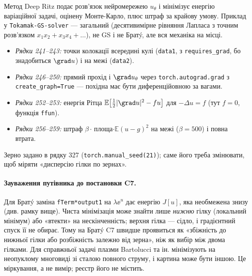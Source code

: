 Метод Deep Ritz \cite{EYu2018} подає розв'язок нейромережею $u_\theta$ і мінімізує
енергію варіаційної задачі, оцінену Монте-Карло, плюс штраф за крайову умову. Приклад у
\texttt{Tokamak-GS-solver} --- загальний (десятивимірне рівняння Лапласа з точним
розв'язком $x_1x_2+x_3x_4+\ldots$), не GS і не Братý, але вся механіка на місці.


\begin{itemize}
\item \emph{Рядки 241--243:} точки колокації всередині кулі (\texttt{data1}, з
  \texttt{requires\_grad}, бо знадобиться $\grad u$) і на межі (\texttt{data2}).
\item \emph{Рядки 246--250:} прямий прохід і $\grad u_\theta$ через
  \texttt{torch.autograd.grad} з \texttt{create\_graph=True} --- похідна має бути
  диференційовною за вагами.
\item \emph{Рядки 252--253:} енергія Рітца $\mathbb{E}\bigl[\tfrac12|\grad u|^2-fu\bigr]$ для
  $-\Delta u=f$ (тут $f=0$, функція \texttt{ffun}).
\item \emph{Рядки 256--259:} штраф $\beta\cdot$\,площа$\cdot\mathbb{E}(u-g)^2$ на межі
  ($\beta=500$) і повна втрата.
\end{itemize}
Зерно задано в рядку 327 (\texttt{torch.manual\_seed(21)}); саме його треба змінювати, щоб
міряти «дисперсію гілки по зернах».

\paragraph{Зауваження путівника до постановки C7.} Для Братý заміна \texttt{fTerm*output1}
на $\lambda\ee^{u}$ дає енергію $J[u]$, яка необмежена знизу (див. рамку вище). Чиста
мінімізація може знайти лише \emph{нижню} гілку (локальний мінімум) або «втекти» на
нескінченність; верхня гілка --- сідло, і градієнтний спуск її не обирає. Тому на Братý
C7 швидше проявиться як «збіжність до нижньої гілки або розбіжність залежно від зерна»,
ніж як вибір між двома гілками. Для справжньої задачі плазми Bartolucci та ін. мінімізують
на неопуклому многовиді зі сталою повного струму, і картина може бути іншою. Це
міркування, а не вимір; реєстр його не містить.

